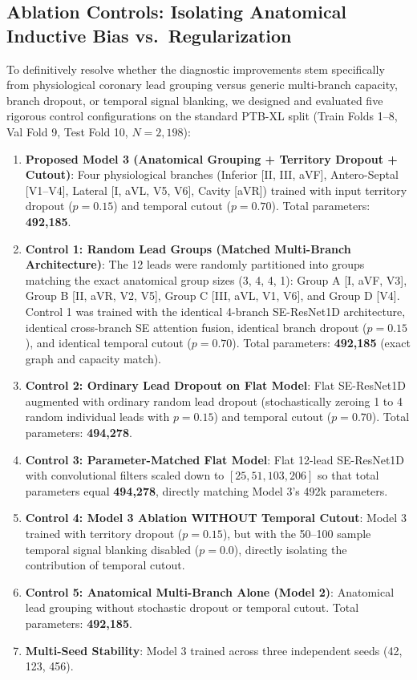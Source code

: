 \documentclass[5p,twocolumn,10pt]{elsarticle}
\begin{document}
\subsection{Ablation Controls: Isolating Anatomical Inductive Bias vs.\ Regularization}
\label{sec:ablation_study}
To definitively resolve whether the diagnostic improvements stem specifically from physiological coronary lead grouping versus generic multi-branch capacity, branch dropout, or temporal signal blanking, we designed and evaluated five rigorous control configurations on the standard PTB-XL split (Train Folds 1--8, Val Fold 9, Test Fold 10, $N = 2,198$):
\begin{enumerate}
    \item \textbf{Proposed Model 3 (Anatomical Grouping + Territory Dropout + Cutout)}: Four physiological branches (Inferior [II, III, aVF], Antero-Septal [V1--V4], Lateral [I, aVL, V5, V6], Cavity [aVR]) trained with input territory dropout ($p=0.15$) and temporal cutout ($p=0.70$). Total parameters: \textbf{492,185}.
    \item \textbf{Control 1: Random Lead Groups (Matched Multi-Branch Architecture)}: The 12 leads were randomly partitioned into groups matching the exact anatomical group sizes (3, 4, 4, 1): Group A [I, aVF, V3], Group B [II, aVR, V2, V5], Group C [III, aVL, V1, V6], and Group D [V4]. Control 1 was trained with the identical 4-branch SE-ResNet1D architecture, identical cross-branch SE attention fusion, identical branch dropout ($p=0.15$), and identical temporal cutout ($p=0.70$). Total parameters: \textbf{492,185} (exact graph and capacity match).
    \item \textbf{Control 2: Ordinary Lead Dropout on Flat Model}: Flat SE-ResNet1D augmented with ordinary random lead dropout (stochastically zeroing 1 to 4 random individual leads with $p=0.15$) and temporal cutout ($p=0.70$). Total parameters: \textbf{494,278}.
    \item \textbf{Control 3: Parameter-Matched Flat Model}: Flat 12-lead SE-ResNet1D with convolutional filters scaled down to $[25, 51, 103, 206]$ so that total parameters equal \textbf{494,278}, directly matching Model 3's 492k parameters.
    \item \textbf{Control 4: Model 3 Ablation WITHOUT Temporal Cutout}: Model 3 trained with territory dropout ($p=0.15$), but with the 50--100 sample temporal signal blanking disabled ($p=0.0$), directly isolating the contribution of temporal cutout.
    \item \textbf{Control 5: Anatomical Multi-Branch Alone (Model 2)}: Anatomical lead grouping without stochastic dropout or temporal cutout. Total parameters: \textbf{492,185}.
    \item \textbf{Multi-Seed Stability}: Model 3 trained across three independent seeds (42, 123, 456).
\end{enumerate}
\end{document}
